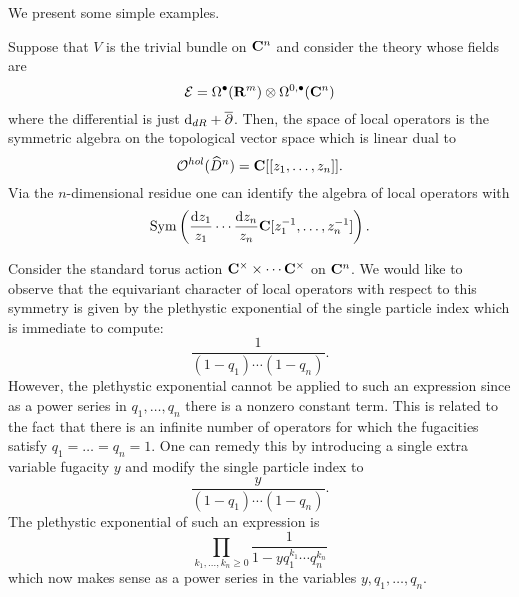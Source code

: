 \parsec[s:examples]

We present some simple examples. 

\begin{eg}
Suppose that $V$ is the trivial bundle on $\mathbf{C}^n$ and consider the theory whose fields are
\[
\mathcal E = \Omega^\bullet(\mathbf{R}^m) \otimes \Omega^{0,\bullet}(\mathbf{C}^n) 
\]
where the differential is just ${\rm d}_{dR} + \overline{\partial}$. 
Then, the space of local operators is the symmetric algebra on the topological vector space which is linear dual to 
\[
\mathcal O^{hol}(\widehat{D}^n) = \mathbf{C}[[z_1,\ldots,z_n]] .
\]
Via the $n$-dimensional residue one can identify the algebra of local operators with 
\[
\operatorname{Sym}\left(\frac{{\rm d} z_1}{z_1} \cdots \frac{{\rm d} z_n}{z_n}  \mathbf{C}[z_1^{-1}, \ldots , z_n^{-1}]\right) .
\]

Consider the standard torus action $\mathbf{C}^\times \times \cdots \mathbf{C}^\times$ on $\mathbf{C}^n$. 
We would like to observe that the equivariant character of local operators with respect to this symmetry is given by the plethystic exponential of the single particle index which is immediate to compute:
\[
\frac{1}{(1-q_1)\cdots (1-q_n)} .
\]
However, the plethystic exponential cannot be applied to such an expression since as a power series in $q_1,\ldots,q_n$ there is a nonzero constant term.
This is related to the fact that there is an infinite number of operators for which the fugacities satisfy $q_1=\ldots=q_n=1$. 
One can remedy this by introducing a single extra variable fugacity $y$ and modify the single particle index to 
\[
\frac{y}{(1-q_1)\cdots (1-q_n)} .
\]
The plethystic exponential of such an expression is
\[
\prod_{k_1,\ldots,k_n \geq 0} \frac{1}{1-y q_1^{k_1}\cdots q_n^{k_n}}
\]
which now makes sense as a power series in the variables $y,q_1,\ldots,q_n$.
\end{eg}

